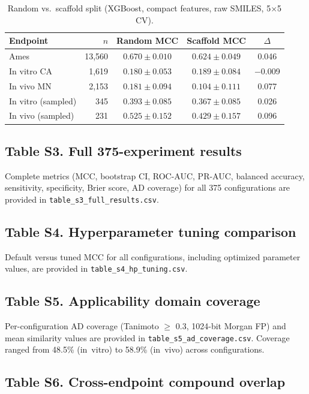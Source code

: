 \begin{table}[ht]
\caption{Random vs.\ scaffold split (XGBoost, compact features, raw SMILES, 5$\times$5 CV).}
\centering
\small
\begin{tabular}{@{}lrccc@{}}
\toprule
Endpoint & $n$ & Random MCC & Scaffold MCC & $\Delta$ \\
\midrule
Ames & 13,560 & $0.670 \pm 0.010$ & $0.624 \pm 0.049$ & 0.046 \\
In vitro CA & 1,619 & $0.180 \pm 0.053$ & $0.189 \pm 0.084$ & $-$0.009 \\
In vivo MN & 2,153 & $0.181 \pm 0.094$ & $0.104 \pm 0.111$ & 0.077 \\
In vitro (sampled) & 345 & $0.393 \pm 0.085$ & $0.367 \pm 0.085$ & 0.026 \\
In vivo (sampled) & 231 & $0.525 \pm 0.152$ & $0.429 \pm 0.157$ & 0.096 \\
\bottomrule
\end{tabular}
\end{table}

\subsection*{Table S3. Full 375-experiment results}

Complete metrics (MCC, bootstrap CI, ROC-AUC, PR-AUC, balanced accuracy, sensitivity, specificity, Brier score, AD coverage) for all 375 configurations are provided in \texttt{table\_s3\_full\_results.csv}.

\subsection*{Table S4. Hyperparameter tuning comparison}

Default versus tuned MCC for all configurations, including optimized parameter values, are provided in \texttt{table\_s4\_hp\_tuning.csv}.

\subsection*{Table S5. Applicability domain coverage}

Per-configuration AD coverage (Tanimoto $\geq$ 0.3, 1024-bit Morgan FP) and mean similarity values are provided in \texttt{table\_s5\_ad\_coverage.csv}. Coverage ranged from 48.5\% (in~vitro) to 58.9\% (in~vivo) across configurations.

\subsection*{Table S6. Cross-endpoint compound overlap}

